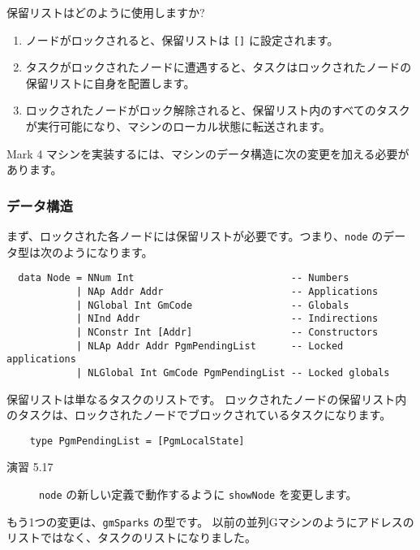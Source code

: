 \documentclass{jarticle}
\begin{document}
保留リストはどのように使用しますか?

\begin{enumerate}
	\item ノードがロックされると、保留リストは \texttt{[]} に設定されます。
	\item タスクがロックされたノードに遭遇すると、タスクはロックされたノードの保留リストに自身を配置します。
	\item ロックされたノードがロック解除されると、保留リスト内のすべてのタスクが実行可能になり、マシンのローカル状態に転送されます。
\end{enumerate}

Mark 4 マシンを実装するには、マシンのデータ構造に次の変更を加える必要があります。

\subsubsection{データ構造}

まず、ロックされた各ノードには保留リストが必要です。つまり、\texttt{node} のデータ型は次のようになります。

\begin{verbatim}
  data Node = NNum Int                           -- Numbers
            | NAp Addr Addr                      -- Applications
            | NGlobal Int GmCode                 -- Globals
            | NInd Addr                          -- Indirections
            | NConstr Int [Addr]                 -- Constructors
            | NLAp Addr Addr PgmPendingList      -- Locked applications
            | NLGlobal Int GmCode PgmPendingList -- Locked globals
\end{verbatim}

保留リストは単なるタスクのリストです。
ロックされたノードの保留リスト内のタスクは、ロックされたノードでブロックされているタスクになります。

\begin{verbatim}
	type PgmPendingList = [PgmLocalState]
\end{verbatim}

\begin{description}
	\item[演習 5.17] \texttt{node} の新しい定義で動作するように \texttt{showNode} を変更します。
\end{description}

もう1つの変更は、\texttt{gmSparks} の型です。
以前の並列Gマシンのようにアドレスのリストではなく、タスクのリストになりました。
\end{document}
